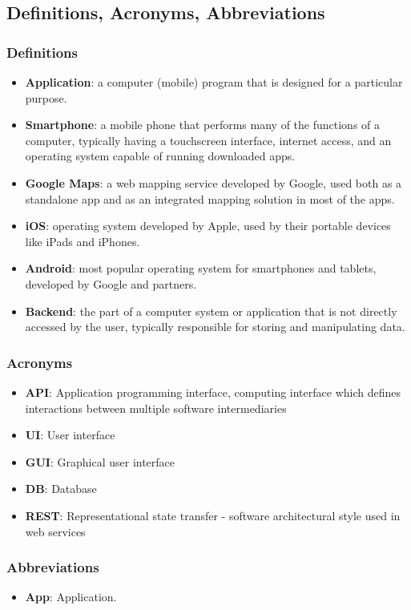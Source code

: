 \newpage

\subsection{Definitions, Acronyms, Abbreviations}
\subsubsection{Definitions}
\begin{itemize} 
	\item \textbf{Application}: a computer (mobile) program that is designed for a particular purpose. 
	\item \textbf{Smartphone}: a mobile phone that performs many of the functions of a computer, typically having a touchscreen interface, internet access, and an operating system capable of running downloaded apps. 
	\item \textbf{Google Maps}: a web mapping service developed by Google, used both as a standalone app and as an integrated mapping solution in most of the apps.
	\item \textbf{iOS}: operating system developed by Apple, used by their portable devices like iPads and iPhones.
	\item \textbf{Android}: most popular operating system for smartphones and tablets, developed by Google and partners.
	\item \textbf{Backend}: the part of a computer system or application that is not directly accessed by the user, typically responsible for storing and manipulating data.
\end{itemize}
\subsubsection{Acronyms}
\begin{itemize}
	\item \textbf{API}: Application programming interface, computing interface which defines interactions between multiple software intermediaries 
	\item \textbf{UI}: User interface	
	\item \textbf{GUI}: Graphical user interface
	\item \textbf{DB}: Database
	\item \textbf{REST}: Representational state transfer - software architectural style used in web services
\end{itemize}
\subsubsection{Abbreviations}
\begin{itemize}
	\item \textbf{App}: Application.
\end{itemize}

\newpage